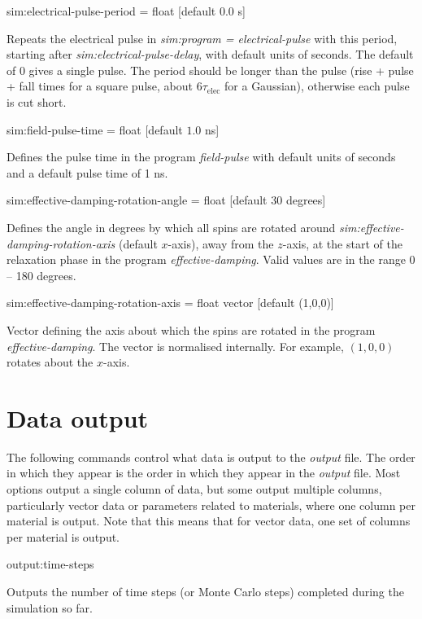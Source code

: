 {\zicf sim:electrical-pulse-period = float [default $0.0$ s]}
Repeats the electrical pulse in \textit{sim:program = electrical-pulse} with this period, starting after
\textit{sim:electrical-pulse-delay}, with default units of seconds. The default of 0 gives a single pulse.
The period should be longer than the pulse (rise + pulse + fall times for a square pulse,
about $6\tau_\mathrm{elec}$ for a Gaussian), otherwise each pulse is cut short.

 {\zicf sim:field-pulse-time = float [default $1.0$ ns]}
 Defines the pulse time in the program \textit{field-pulse} with default
 units of seconds and a default pulse time of 1 ns.

 {\zicf sim:effective-damping-rotation-angle = float [default $30$ degrees]}
 Defines the angle in degrees by which all spins are rotated around
 \textit{sim:effective-damping-rotation-axis} (default $x$-axis), away from the $z$-axis,
 at the start of the relaxation phase in the program
 \textit{effective-damping}. Valid values are in the range 0 -- 180 degrees.

 {\zicf sim:effective-damping-rotation-axis = float vector [default (1,0,0)]}
 Vector defining the axis about which the spins are rotated in the program
 \textit{effective-damping}. The vector is normalised internally. For example,
 $(1,0,0)$ rotates about the $x$-axis.

\section*{Data output}
The following commands control what data is output to the \textit{output} file. The order in which they appear is the order in which they appear in the \textit{output} file. Most options output a single column of data, but some output multiple columns, particularly vector data or parameters related to materials, where one column per material is output. Note that this means that for vector data, one set of columns per material is output.

{\zicf output:time-steps} Outputs the number of time steps (or Monte Carlo steps) completed during the simulation so far.

